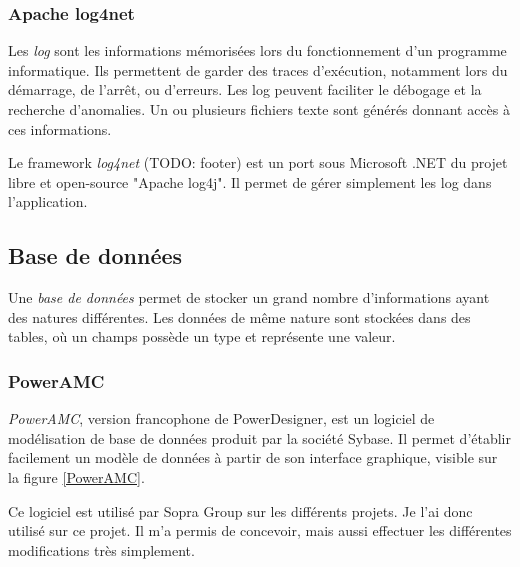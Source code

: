 \subsubsection{Apache log4net}


Les \textit{log} sont les informations mémorisées lors du fonctionnement d'un programme informatique. Ils permettent de garder des traces d'exécution, notamment lors du démarrage, de l'arrêt, ou d'erreurs. Les log peuvent faciliter le débogage et la recherche d'anomalies. Un ou plusieurs fichiers texte sont générés donnant accès à ces informations.

Le framework \textit{log4net} (TODO: footer) est un port sous Microsoft .NET du projet libre et open-source "Apache log4j". Il permet de gérer simplement les log dans l'application.


\subsection{Base de données}

Une \textit{base de données} permet de stocker un grand nombre d'informations ayant des natures différentes. Les données de même nature sont stockées dans des tables, où un champs possède un type et représente une valeur.


\subsubsection{PowerAMC}

\textit{PowerAMC}, version francophone de PowerDesigner, est un logiciel de modélisation de base de données produit par la société Sybase. Il permet d'établir facilement un modèle de données à partir de son interface graphique, visible sur la figure \ref{PowerAMC}.

Ce logiciel est utilisé par Sopra Group sur les différents projets. Je l'ai donc utilisé sur ce projet. Il m'a permis de concevoir, mais aussi effectuer les différentes modifications très simplement.


